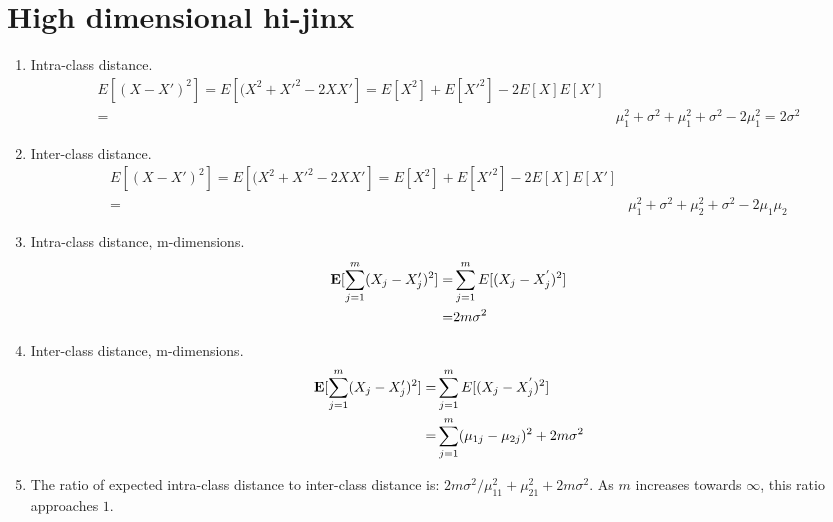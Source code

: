 \section{High dimensional hi-jinx}

\begin{enumerate}
\item Intra-class distance. \begin{align*}
E[(X-X')^{2}]=E[(X^{2}+X'^{2}-2XX']=E[X^{2}]+E[X'^{2}]-2E[X]E[X'] \\
= & \mu_{1}^{2}+\sigma^{2}+\mu_{1}^{2}+\sigma^{2}-2\mu_{1}^{2}=2\sigma^{2}\end{align*}

\item Inter-class distance. \begin{align*}
E[(X-X')^{2}]=E[(X^{2}+X'^{2}-2XX']=E[X^{2}]+E[X'^{2}]-2E[X]E[X'] \\
= & \mu_{1}^{2}+\sigma^{2}+\mu_{2}^{2}+\sigma^{2}-2\mu_{1}\mu_{2}\end{align*}


\item Intra-class distance, m-dimensions. \begin{align*}
\mathbf{E}[\sum_{j=1}^{m}(X_{j}-X'_{j})^{2}]= & \sum_{j=1}^{m}E[(X_{j}-X_{j}^{'})^{2}]\\
= & 2m\sigma^{2}\end{align*}


\item Inter-class distance, m-dimensions. \begin{align*}
\mathbf{E}[\sum_{j=1}^{m}(X_{j}-X'_{j})^{2}]= & \sum_{j=1}^{m}E[(X_{j}-X_{j}^{'})^{2}]\\
= & \sum_{j=1}^{m}(\mu_{1j}-\mu_{2j})^{2}+2m\sigma^{2}\end{align*}

\item The ratio of expected intra-class distance to inter-class distance
is: $2m\sigma^{2}/\mu_{11}^{2}+\mu_{21}^{2}+2m\sigma^{2}$. As $m$
increases towards $\infty$, this ratio approaches $1$. 
\end{enumerate}
